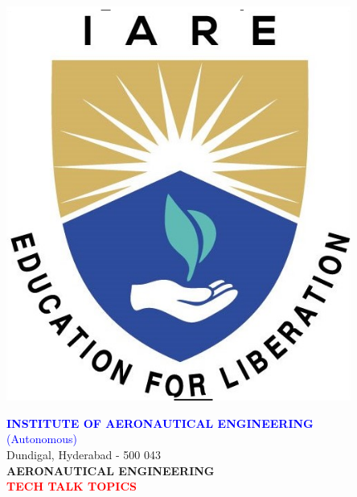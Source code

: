 \documentclass[11pt,paper=a4,answers]{exam}
\begin{document}
	\begin{minipage}{0.15\linewidth}%
		\flushleft
		\includegraphics[width=0.85\textwidth]{iare.png}\end{minipage}
	\begin{minipage}[r]{0.84\textwidth}%
		\noindent
		\begin{center}	
			\textcolor{blue}{\Large \bfseries INSTITUTE OF AERONAUTICAL ENGINEERING}\\
			\textcolor{blue}{\Large (Autonomous)} \\
			\small Dundigal, Hyderabad - 500 043 \\  [3pt] 
			\vspace{5pt}
			\large \bfseries AERONAUTICAL ENGINEERING \\\vspace{5pt}
			\textcolor{red}{\large \bfseries TECH TALK TOPICS} \\\vspace{3pt}
		\end{center}
	\end{minipage}
	\vspace{0.5cm}
\end{document}
